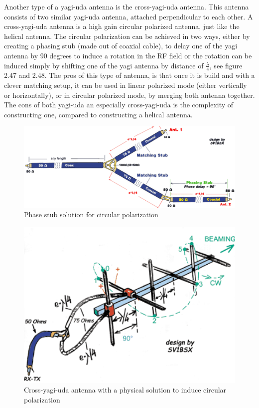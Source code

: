 Another type of a yagi-uda antenna is the cross-yagi-uda antenna. This antenna consists of two similar yagi-uda antenna, attached perpendicular to each other. A cross-yagi-uda antenna is a high gain circular polarized antenna, just like the helical antenna. The circular polarization can be achieved in two ways, either by creating a phasing stub (made out of coaxial cable), to delay one of the yagi antenna by 90 degrees to induce a rotation in the RF field or the rotation can be induced simply by shifting one of the yagi antenna by distance of $\frac{\lambda}{4}$, see figure 2.47 and 2.48. The pros of this type of antenna, is that once it is build and with a clever matching setup, it can be used in linear polarized mode (either vertically or horizontally), or in circular polarized mode, by merging both antenna together. The cons of both yagi-uda an especially cross-yagi-uda is the complexity of constructing one, compared to constructing a helical antenna. 

\begin{figure}[h]
\centering
\includegraphics[scale=0.8]{figures/PhaseStub.PNG}
\caption{Phase stub solution for circular polarization\cite{YagiMatching}}
\end{figure}

\begin{figure}[h]
\centering
\includegraphics[scale=0.8]{figures/CrossYagi.PNG}
\caption{Cross-yagi-uda antenna with a physical solution to induce circular polarization\cite{YagiMatching}}
\end{figure}

